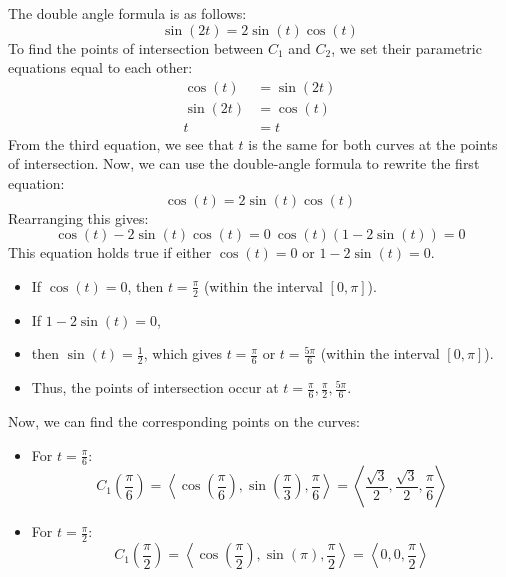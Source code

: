 \documentclass[reqno, 12pt]{amsart}
\begin{document}
\begin{itemize}
\begin{itemize}
        \begin{answerbox}
          The double angle formula is as follows:
          \[
            \sin(2t) = 2\sin(t)\cos(t)
          \]
          To find the points of intersection between \( C_1 \) and \( C_2
          \), we set their parametric equations equal to each other:
          \[
            \begin{aligned}
              \cos(t) &= \sin(2t) \\
              \sin(2t) &= \cos(t) \\
              t &= t
            \end{aligned}
          \]
          From the third equation, we see that \( t \) is the same for both curves
          at the points of intersection. Now, we can use the double-angle formula to rewrite the first equation:
          \[
            \cos(t) = 2\sin(t)\cos(t)
          \]
          Rearranging this gives:
          \[
            \cos(t) - 2\sin(t)\cos(t) = 0 \
            \cos(t)(1 - 2\sin(t)) = 0
          \]
          This equation holds true if either \( \cos(t) = 0 \) or \( 1 - 2\sin(t) = 0 \).
          \begin{itemize}
            \item If \( \cos(t) = 0 \), then \( t = \frac{\pi}{2} \) (within the interval \( [0, \pi] \)).
            \item If \( 1 - 2\sin(t) = 0 \),
            \item then \( \sin(t) = \frac{1}{2} \), which gives \( t = \frac{\pi}{6} \) or \( t = \frac{5\pi}{6} \) (within the interval \( [0, \pi] \)).
            \item Thus, the points of intersection occur at \( t = \frac{\pi}{6}, \frac{\pi}{2}, \frac{5\pi}{6} \).
          \end{itemize}
          Now, we can find the corresponding points on the curves:
          \begin{itemize}
            \item For \( t = \frac{\pi}{6} \):
              \[
                C_1\left(\frac{\pi}{6}\right) = \left\langle\cos\left(\frac{\pi}{6}\right), \sin\left(\frac{\pi}{3}\right), \frac{\pi}{6}\right\rangle = \left\langle\frac{\sqrt{3}}{2}, \frac{\sqrt{3}}{2}, \frac{\pi}{6}\right\rangle
              \]
            \item For \( t = \frac{\pi}{2} \):
              \[
                C_1\left(\frac{\pi}{2}\right) = \left\langle\cos\left(\frac{\pi}{2}\right), \sin(\pi), \frac{\pi}{2}\right\rangle = \left\langle 0, 0, \frac{\pi}{2}\right\rangle
\]
\end{itemize}
\end{answerbox}
\end{itemize}
\end{itemize}
\end{document}
